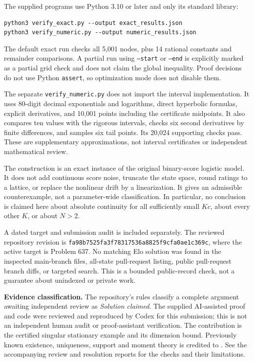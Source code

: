 \documentclass[11pt]{article}
\theoremstyle{remark}
\begin{document}
The supplied programs use Python 3.10 or later and only its standard library:
\begin{verbatim}
python3 verify_exact.py --output exact_results.json
python3 verify_numeric.py --output numeric_results.json
\end{verbatim}
The default exact run checks all 5,001 nodes, plus 14 rational constants and remainder comparisons. A partial run using \texttt{--start} or \texttt{--end} is explicitly marked as a partial grid check and does not claim the global inequality. Proof decisions do not use Python \texttt{assert}, so optimization mode does not disable them.

The separate \texttt{verify\_numeric.py} does not import the interval implementation. It uses 80-digit decimal exponentials and logarithms, direct hyperbolic formulas, explicit derivatives, and 10,001 points including the certificate midpoints. It also compares ten values with the rigorous intervals, checks six second derivatives by finite differences, and samples six tail points. Its 20,024 supporting checks pass. These are supplementary approximations, not interval certificates or independent mathematical review.

The construction is an exact instance of the original binary-score logistic model. It does not add continuous score noise, truncate the state space, round ratings to a lattice, or replace the nonlinear drift by a linearization. It gives an admissible counterexample, not a parameter-wide classification. In particular, no conclusion is claimed here about absolute continuity for all sufficiently small $Kc$, about every other $K$, or about $N>2$.

A dated target and submission audit is included separately. The reviewed repository revision is \texttt{fa98b7525fa3f78317536a8825f9cfa0ae1c369c}, where the active target is Problem 637. No matching Elo solution was found in the inspected main-branch files, all-state pull-request listing, public pull-request branch diffs, or targeted search. This is a bounded public-record check, not a guarantee about unindexed or private work.

\textbf{Evidence classification.} The repository's rules \cite{contrib} classify a complete argument awaiting independent review as \emph{Solution claimed}. The supplied AI-assisted proof and code were reviewed and reproduced by Codex for this submission; this is not an independent human audit or proof-assistant verification. The contribution is the certified singular stationary example and its dimension bound. Previously known existence, uniqueness, support and moment theory is credited to \cite{ct}. See the accompanying review and resolution reports for the checks and their limitations.
\end{document}
